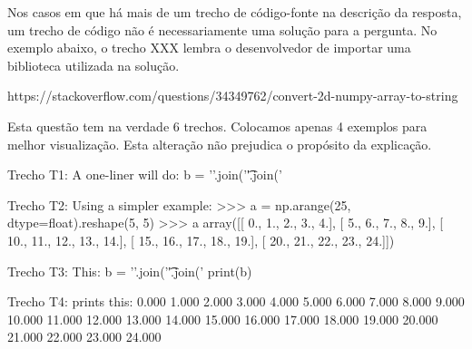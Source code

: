 Nos casos em que há mais de um trecho de código-fonte na descrição da resposta, um trecho de código não é necessariamente uma solução para a pergunta. No exemplo abaixo, o trecho XXX lembra o desenvolvedor de importar uma biblioteca utilizada na solução.


https://stackoverflow.com/questions/34349762/convert-2d-numpy-array-to-string

Esta questão tem na verdade 6 trechos. Colocamos apenas 4 exemplos para melhor visualização. Esta alteração não prejudica o propósito da explicação.

\begin{tcolorbox}[colframe=orange!75!black,colback=white,fonttitle=\bfseries,adjusted title=\large{Título da questão: convert 2d numpy array to string}]
\begin{mypython}{Trecho T1: A one-liner will do:}
b = '\n'.join('\t'.join('%
\end{mypython}
\begin{mypython}{Trecho T2: Using a simpler example:}
>>> a = np.arange(25, dtype=float).reshape(5, 5)
>>> a
array([[  0.,   1.,   2.,   3.,   4.],
       [  5.,   6.,   7.,   8.,   9.],
       [ 10.,  11.,  12.,  13.,  14.],
       [ 15.,  16.,  17.,  18.,  19.],
       [ 20.,  21.,  22.,  23.,  24.]])
\end{mypython}
\begin{mypython}{Trecho T3: This:}
b = '\n'.join('\t'.join('%
print(b)
\end{mypython}
\begin{mypython}{Trecho T4: prints this:}
0.000   1.000   2.000   3.000   4.000
5.000   6.000   7.000   8.000   9.000
10.000  11.000  12.000  13.000  14.000
15.000  16.000  17.000  18.000  19.000
20.000  21.000  22.000  23.000  24.000
\end{mypython}
\end{tcolorbox}





